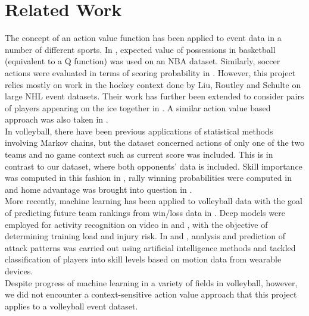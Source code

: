 \documentclass{sfuthesis}
\begin{document}
	\section{Related Work}
	The concept of an action value function has been applied to event data in a number of different sports. In \cite{cervone2014pointwise}, expected value of possessions in basketball (equivalent to a Q function) was used on an NBA dataset. Similarly, soccer actions were evaluated in terms of scoring probability in \cite{decroos2019actions}. However, this project relies mostly on work in the hockey context done by Liu, Routley and Schulte \cite{liu2018deep, routley2015markov, schulte2017markov, schulte2017apples} on large NHL event datasets. Their work has further been extended to consider pairs of players appearing on the ice together in \cite{Ljung2019}. A similar action value based approach was also taken in \cite{kaplan2014markov}.\\
	In volleyball, there have been previous applications of statistical methods involving Markov chains, but the dataset concerned actions of only one of the two teams and no game context such as current score was included. This is in contrast to our dataset, where both opponents' data is included. Skill importance was computed in this fashion in \cite{miskin2010skill}, rally winning probabilities were computed in \cite{florence2008skill} and home advantage was brought into question in \cite{alexandros2012existence}.\\
	More recently, machine learning has been applied to volleyball data with the goal of predicting future team rankings from win/loss data in \cite{tumer2017prediction}.  Deep models were employed for activity recognition on video in \cite{ibrahim2018deep} and \cite{kautz2017activity}, with the objective of determining training load and injury risk. In \cite{wenninger2020performance} and \cite{van2016analyzing}, analysis and prediction of attack patterns was carried out using artificial intelligence methods and \cite{wang2018volleyball} tackled classification of players into skill levels based on motion data from wearable devices.\\
	Despite progress of machine learning in a variety of fields in volleyball, however, we did not encounter a context-sensitive action value approach that this project applies to a volleyball event dataset.
\end{document}
